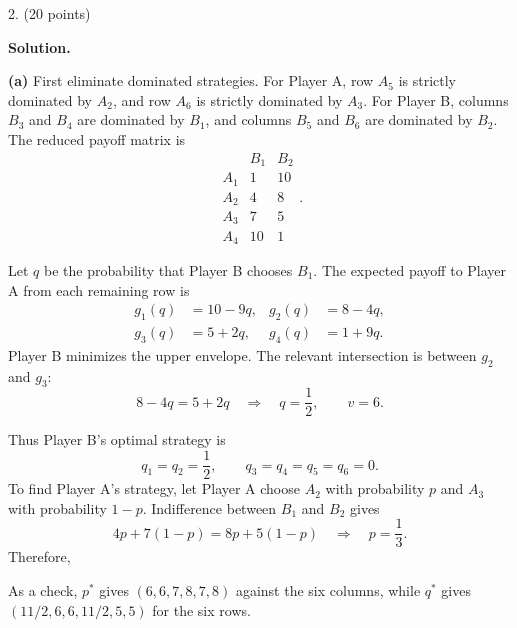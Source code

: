 \documentclass[11pt,letterpaper]{article}
\newenvironment{examquestion}[2]{%
  \clearpage
  \begin{list}{}{%
    \setlength{\leftmargin}{2.15em}%
    \setlength{\labelwidth}{1.55em}%
    \setlength{\labelsep}{0.60em}%
    \setlength{\itemindent}{0pt}%
    \setlength{\listparindent}{0pt}%
    \setlength{\parsep}{0.42em}%
    \setlength{\topsep}{0pt}%
  }
  \item[\hfill #1.] (#2 points)\ 
}{%
  \end{list}
}
\newenvironment{solution}{%
  \par\medskip
  \color{red}
  \noindent\textbf{Solution.}\par
}{%
  \par
  \color{black}
}
\newcommand{\answerbox}[1]{%
  \par\smallskip\begingroup
  \setlength{\fboxsep}{4pt}%
  \setlength{\fboxrule}{0.7pt}%
  \noindent\makebox[\linewidth][c]{\fbox{$\displaystyle #1$}}%
  \par\endgroup\smallskip
}
\begin{document}
\begin{examquestion}{2}{20}
\begin{solution}
\textbf{(a)} First eliminate dominated strategies. For Player A, row $A_5$ is
strictly dominated by $A_2$, and row $A_6$ is strictly dominated by $A_3$. For
Player B, columns $B_3$ and $B_4$ are dominated by $B_1$, and columns $B_5$ and
$B_6$ are dominated by $B_2$. The reduced payoff matrix is
\[
\begin{array}{c|cc}
&B_1&B_2\\ \hline
A_1&1&10\\
A_2&4&8\\
A_3&7&5\\
A_4&10&1
\end{array}.
\]

Let $q$ be the probability that Player B chooses $B_1$. The expected payoff to
Player A from each remaining row is
\[
\begin{aligned}
g_1(q)&=10-9q, & g_2(q)&=8-4q,\\
g_3(q)&=5+2q,  & g_4(q)&=1+9q.
\end{aligned}
\]
Player B minimizes the upper envelope. The relevant intersection is between
$g_2$ and $g_3$:
\[
8-4q=5+2q
\quad\Longrightarrow\quad
q=\frac12,
\qquad v=6.
\]

\begin{center}
\end{center}

Thus Player B's optimal strategy is
\[
q_1=q_2=\frac12,
\qquad q_3=q_4=q_5=q_6=0.
\]
To find Player A's strategy, let Player A choose $A_2$ with probability $p$ and
$A_3$ with probability $1-p$. Indifference between $B_1$ and $B_2$ gives
\[
4p+7(1-p)=8p+5(1-p)
\quad\Longrightarrow\quad
p=\frac13.
\]
Therefore,
\answerbox{
p^*=\left(0,\frac13,\frac23,0,0,0\right),
\qquad
q^*=\left(\frac12,\frac12,0,0,0,0\right),
\qquad v=6
}
As a check, $p^*$ gives $(6,6,7,8,7,8)$ against the six columns, while
$q^*$ gives $(11/2,6,6,11/2,5,5)$ for the six rows.


\end{solution}
\end{examquestion}
\end{document}
